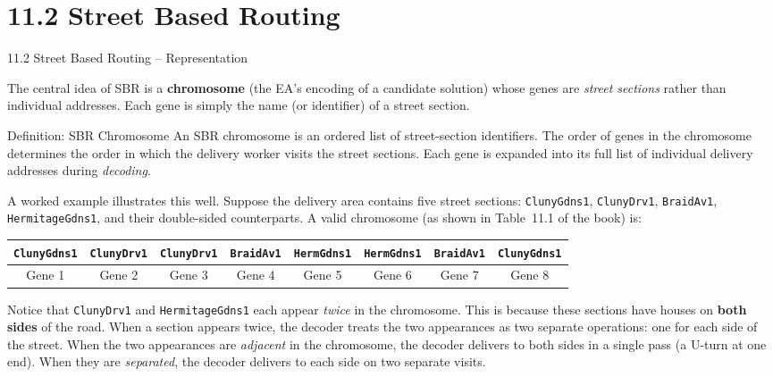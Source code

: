 \documentclass[aspectratio=169,10pt]{beamer}
\begin{document}
\section{11.2 Street Based Routing}

\begin{frame}[allowframebreaks]{11.2 Street Based Routing -- Representation}

  The central idea of SBR is a \textbf{chromosome} (the EA's encoding of a
  candidate solution) whose genes are \emph{street sections} rather than
  individual addresses.  Each gene is simply the name (or identifier) of a
  street section.

  \begin{block}{Definition: SBR Chromosome}
    An SBR chromosome is an ordered list of street-section identifiers.
    The order of genes in the chromosome determines the order in which the
    delivery worker visits the street sections.  Each gene is expanded into
    its full list of individual delivery addresses during \emph{decoding}.
  \end{block}

  A worked example illustrates this well.  Suppose the delivery area contains
  five street sections: \texttt{ClunyGdns1}, \texttt{ClunyDrv1},
  \texttt{BraidAv1}, \texttt{HermitageGdns1}, and their double-sided
  counterparts.  A valid chromosome (as shown in Table~11.1 of the book) is:

  \begin{center}
    \begin{tabular}{|c|c|c|c|c|c|c|c|}
      \hline
      \texttt{ClunyGdns1} & \texttt{ClunyDrv1} & \texttt{ClunyDrv1} &
      \texttt{BraidAv1} & \texttt{HermGdns1} & \texttt{HermGdns1} &
      \texttt{BraidAv1} & \texttt{ClunyGdns1} \\
      \hline
      Gene 1 & Gene 2 & Gene 3 & Gene 4 & Gene 5 & Gene 6 & Gene 7 & Gene 8 \\
      \hline
    \end{tabular}
  \end{center}

  Notice that \texttt{ClunyDrv1} and \texttt{HermitageGdns1} each appear
  \emph{twice} in the chromosome.  This is because these sections have houses
  on \textbf{both sides} of the road.  When a section appears twice, the
  decoder treats the two appearances as two separate operations: one for each
  side of the street.  When the two appearances are \emph{adjacent} in the
  chromosome, the decoder delivers to both sides in a single pass (a U-turn
  at one end).  When they are \emph{separated}, the decoder delivers to each
  side on two separate visits.


\end{frame}
\end{document}
